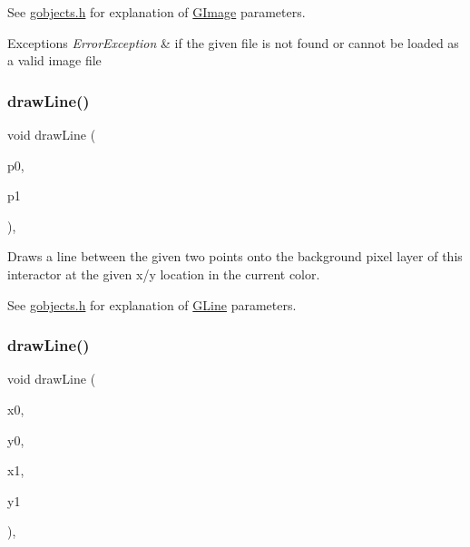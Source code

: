 See \mbox{\hyperlink{gobjects_8h_source}{gobjects.\+h}} for explanation of \mbox{\hyperlink{classGImage}{G\+Image}} parameters. 
\begin{DoxyExceptions}{Exceptions}
{\em Error\+Exception} & if the given file is not found or cannot be loaded as a valid image file \\
\hline
\end{DoxyExceptions}
\mbox{\label{classGDrawingSurface_ae6a24b6b9a6e795d3165c1c750d5bdf1}} 
\subsubsection{\texorpdfstring{draw\+Line()}{drawLine()}\hspace{0.1cm}{\footnotesize\ttfamily [1/2]}}
{\footnotesize\ttfamily void draw\+Line (\begin{DoxyParamCaption}\item[{const \mbox{\hyperlink{structGPoint}{G\+Point}} \&}]{p0,  }\item[{const \mbox{\hyperlink{structGPoint}{G\+Point}} \&}]{p1 }\end{DoxyParamCaption})\hspace{0.3cm}{\ttfamily [virtual]}, {\ttfamily [inherited]}}



Draws a line between the given two points onto the background pixel layer of this interactor at the given x/y location in the current color. 

See \mbox{\hyperlink{gobjects_8h_source}{gobjects.\+h}} for explanation of \mbox{\hyperlink{classGLine}{G\+Line}} parameters. \mbox{\label{classGDrawingSurface_aff299fe83178d2f3ce8c08c06b583484}} 
\subsubsection{\texorpdfstring{draw\+Line()}{drawLine()}\hspace{0.1cm}{\footnotesize\ttfamily [2/2]}}
{\footnotesize\ttfamily void draw\+Line (\begin{DoxyParamCaption}\item[{double}]{x0,  }\item[{double}]{y0,  }\item[{double}]{x1,  }\item[{double}]{y1 }\end{DoxyParamCaption})\hspace{0.3cm}{\ttfamily [virtual]}, {\ttfamily [inherited]}}



